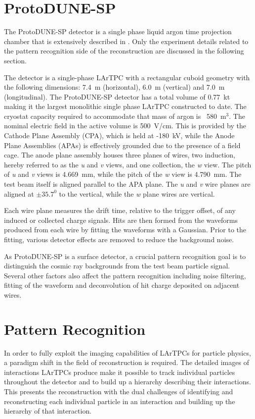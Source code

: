 \section{ProtoDUNE-SP}
\label{sec:protodunesp}
The ProtoDUNE-SP detector is a single phase liquid argon time projection chamber that is extensively described in \cite{pdtdr}.  Only the experiment details related to the pattern recognition side of the reconstruction are discussed in the following section.

The detector is a single-phase LArTPC with a rectangular cuboid geometry with the following dimensions: 7.4~m (horizontal), 6.0~m (vertical) and 7.0~m (longitudinal).  The ProtoDUNE-SP detector has a total volume of 0.77~kt making it the largest monolithic single phase LArTPC constructed to date.  The cryostat capacity required to accommodate that mass of argon is ~580~$\text{m}^{3}$.  The nominal electric field in the active volume is 500~V/cm.  This is provided by the Cathode Plane Assembly (CPA), which is held at -180~kV, while the Anode Plane Assemblies (APAs) is effectively grounded due to the presence of a field cage.  The anode plane assembly houses three planes of wires, two induction, hereby referred to as the \textit{u} and \textit{v} views, and one collection, the \textit{w} view.  The pitch of \textit{u} and \textit{v} views is 4.669~mm, while the pitch of the \textit{w} view is 4.790~mm.  The test beam itself is aligned parallel to the APA plane.  The \textit{u} and \textit{v} wire planes are aligned at $\pm 35.7^{0}$ to the vertical, while the \textit{w} plane wires are vertical.  

Each wire plane measures the drift time, relative to the trigger offset, of any induced or collected charge signals.  Hits are then formed from the waveforms produced from each wire by fitting the waveforms with a Gaussian.  Prior to the fitting, various detector effects are removed to reduce the background noise.  

As ProtoDUNE-SP is a surface detector, a crucial pattern recognition goal is to distinguish the cosmic ray backgrounds from the test beam particle signal.  Several other factors also affect the pattern recognition including noise filtering, fitting of the waveform and deconvolution of hit charge deposited on adjacent wires.  


\section{Pattern Recognition}
\label{sec:patrec}
In order to fully exploit the imaging capabilities of LArTPCs for particle physics, a paradigm shift in the field of reconstruction is required.  The detailed images of interactions LArTPCs produce make it possible to track individual particles throughout the detector and to build up a hierarchy describing their interactions.  This presents the reconstruction with the dual challenges of identifying and reconstructing each individual particle in an interaction and building up the hierarchy of that interaction.

